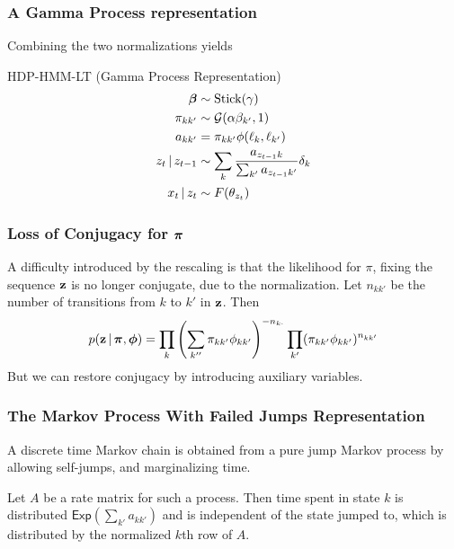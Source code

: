 \documentclass[11pt, serif, mathserif, table,trans]{beamer}
\begin{document}
\begin{frame}
  \frametitle{A Gamma Process representation}
  Combining the two normalizations yields
  \begin{infoblock}{HDP-HMM-LT (Gamma Process Representation)}
    \begin{align}
      \boldsymbol{\beta} &\sim \mathrm{Stick}(\gamma) \\
      \pi_{kk'} &\sim \mathcal{G}(\alpha\beta_{k'},1) \\
      a_{kk'} &= \pi_{kk'}\phi(\ell_k, \ell_{k'}) \\
      z_t \, \vert \, z_{t-1} &\sim \sum_{k} \frac{a_{z_{t-1}k}}{\sum_{k'}
        a_{z_{t-1}k'}} \delta_{k} \\
      x_t \, \vert \, z_t &\sim F(\theta_{z_t})
    \end{align}
  \end{infoblock}
\end{frame}
\begin{frame}
  \frametitle{Loss of Conjugacy for $\boldsymbol{\pi}$}
  A difficulty introduced by the rescaling is that the likelihood for
  $\pi$, fixing the sequence $\mathbf{z}$ is no longer conjugate, due to the
  normalization.  Let
  $n_{kk'}$ be the number of transitions from $k$ to $k'$ in $\mathbf{z}$.
  Then
  \begin{equation}
    \label{eq:17}
    p(\mathbf{z} \, \vert \, \boldsymbol{\pi}, \boldsymbol{\phi}) = \prod_{k} \left(\sum_{k''}
      \pi_{kk'}\phi_{kk'}\right)^{-n_{k\cdot}} \prod_{k'} (\pi_{kk'}\phi_{kk'})^{n_{kk'}}
  \end{equation}
  But we can restore conjugacy by introducing auxiliary variables.
\end{frame}
\begin{frame}
  \frametitle{The Markov Process With Failed Jumps Representation}
  A discrete time Markov chain is obtained from a pure jump Markov process by
  allowing self-jumps, and marginalizing time.
  \pause

  \vspace{0.2in}

  Let $A$ be a rate matrix for such a process.  Then time spent in
  state $k$ is distributed $\mathsf{Exp}(\sum_{k'} a_{kk'})$ and is
  independent of the state jumped to, which is distributed by
  the normalized $k$th row of $A$.
\end{frame}
\end{document}
